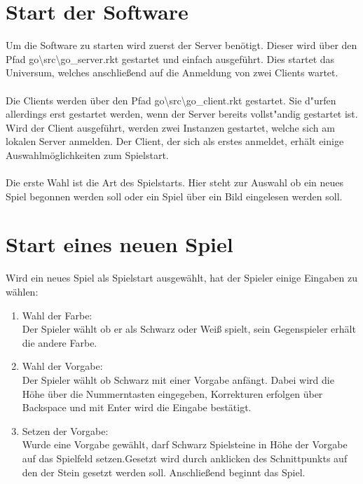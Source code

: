 \documentclass[a4paper]{scrreprt}
\begin{document}
{\section {Start der Software}
\label{sec:start}
Um die Software zu starten wird zuerst der Server benötigt. Dieser wird über den Pfad go\textbackslash{}src\textbackslash{}go\_server.rkt  gestartet und einfach ausgeführt.
Dies startet das Universum, welches anschließend auf die Anmeldung von zwei Clients wartet.\\\\
Die Clients werden über den Pfad go\textbackslash{}src\textbackslash{}go\_client.rkt gestartet. Sie d"urfen allerdings erst gestartet werden, wenn der Server bereits vollst"andig gestartet ist. Wird der Client ausgeführt, werden zwei Instanzen gestartet, welche sich am lokalen Server anmelden. Der Client, der sich als erstes anmeldet, erhält einige Auswahlmöglichkeiten zum Spielstart.\\\\
Die erste Wahl ist die Art des Spielstarts. Hier steht zur Auswahl ob ein neues Spiel begonnen werden soll oder ein Spiel über ein Bild eingelesen werden soll.


\section{Start eines neuen Spiel}
Wird ein neues Spiel als Spielstart ausgewählt, hat der Spieler einige Eingaben zu wählen:

\begin{enumerate}
\item Wahl der Farbe:\\
Der Spieler wählt ob er als Schwarz oder Weiß spielt, sein Gegenspieler erhält die andere Farbe.

\item Wahl der Vorgabe:\\
Der Spieler wählt ob Schwarz mit einer Vorgabe anfängt. Dabei wird die Höhe über die Nummerntasten eingegeben, Korrekturen erfolgen über Backspace und mit Enter wird die Eingabe bestätigt.

\item Setzen der Vorgabe:\\
Wurde eine Vorgabe gewählt, darf Schwarz Spielsteine in Höhe der Vorgabe auf das Spielfeld setzen.Gesetzt wird durch anklicken des Schnittpunkts auf den der Stein gesetzt werden soll. Anschließend beginnt das Spiel.

\end{enumerate}

}
\end{document}
